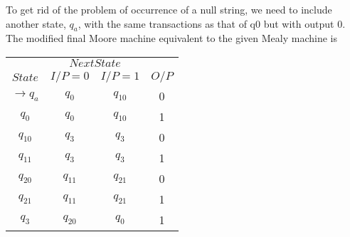 \documentclass[8pt]{beamer}
\begin{document}
\begin{frame}
\begin{center}
\begin{tabular}{cccc}
 \hline

 \hline

 \hline
\end{tabular}
\end{center}

\vspace*{0.3cm}

\end{frame}

\begin{frame}
To get rid of the problem of occurrence of a null string, we need to include another state, $q_a$, with
the same transactions as that of q0 but with output 0.\\
\hspace*{0.5cm} The modified final Moore machine equivalent to the given Mealy machine is\\

\begin{center}
\begin{tabular}{cccc}
 \hline

 \hline

 \hline

 \hline
 & \multicolumn{2}{c}{$Next State$}\\
 \cline{2-3}
 $State$ &  $I/P=0$ & $I/P=1$  &  $O/P$\\
\hline
$\rightarrow q_a$ & $q_0$  & $q_10$  & 0\\
$q_0$ & $q_0$ & $q_10$ &1\\
$q_10$ & $q_3$ & $q_3$ &0\\
$q_11$ & $q_3$ & $q_3$ &1\\
$q_20$ & $q_11$ & $q_21$ &0\\
$q_21$ & $q_11$ & $q_21$ &1\\
$q_3$  & $q_20$ & $q_0$ &1\\
 \hline

 \hline

 \hline

 \hline
\end{tabular}
\end{center}

\vspace*{0.3cm}
\end{frame}
\end{document}

